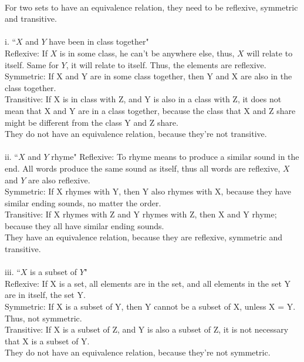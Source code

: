 \documentclass[addpoints]{exam}
\begin{document}
\begin{questions}
\begin{parts}
  \begin{solution}
    \\
    For two sets to have an equivalence relation, they need to be reflexive, symmetric and transitive. \\ \\
    i.  ``$X$ and $Y$ have been in class together" \\
    Reflexive: If $X$ is in some class, he can't be anywhere else, thus, $X$ will relate to itself. Same for $Y$, it will relate to itself. Thus, the elements are reflexive. \\ 
    Symmetric: If X and Y are in some class together, then Y and X are also in the class together. \\
    Transitive: If X is in class with Z, and Y is also in a class with Z, it does not mean that X and Y are in a class together, because the class that X and Z share might be different from the class Y and Z share.  \\
    They do not have an equivalence relation, because they're not transitive. \\ \\
    ii. ``$X$ and $Y$ rhyme" 
    Reflexive: To rhyme means to produce a similar sound in the end. All words produce the same sound as itself, thus all words are reflexive, $X$ and $Y$ are also reflexive. \\ 
    Symmetric: If X rhymes with Y, then Y also rhymes with X, because they have similar ending sounds, no matter the order. \\
    Transitive: If X rhymes with Z and Y rhymes with Z, then X and Y rhyme; because they all have similar ending sounds. \\ 
    They have an equivalence relation, because they are reflexive, symmetric and transitive. \\ \\
    iii.  ``$X$ is a subset of $Y$" \\ 
    Reflexive: If X is a set, all elements are in the set, and all elements in the set Y are in itself, the set Y. \\
    Symmetric: If X is a subset of Y, then Y cannot be a subset of X, unless X = Y. Thus, not symmetric. \\
    Transitive: If X is a subset of Z, and Y is also a subset of Z, it is not necessary that X is a subset of Y. \\
    They do not have an equivalence relation, because they're not symmetric.


\end{solution}
\end{parts}
\end{questions}
\end{document}
